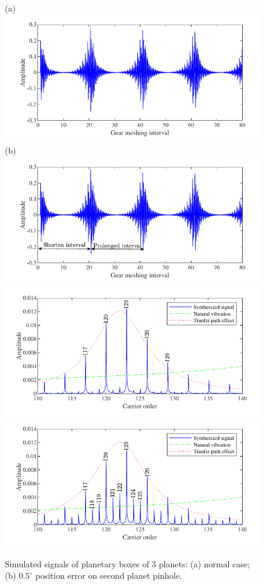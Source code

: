 \documentclass[a4paper,fleqn]{cas-sc}%
\begin{document}
\begin{figure}[pos=htbp]
    \centering
    (a) \includegraphics[scale=\myscale,valign=t]{Time_p3_normal.pdf}
    (b) \includegraphics[scale=\myscale,valign=t]{Time_p3_fault.pdf}\\
    \hspace*{1.5em}\includegraphics[scale=\myscale,valign=t]{Freq_p3_normal.pdf}
    \hspace*{1.5em}\includegraphics[scale=\myscale,valign=t]{Freq_p3_fault.pdf}
    \caption{Simulated signals of planetary boxes of 3 planets: (a) normal case; (b) $0.5^\circ$ position error on second planet pinhole.}
    \label{fig:simulated_p3}
\end{figure}
\end{document}
